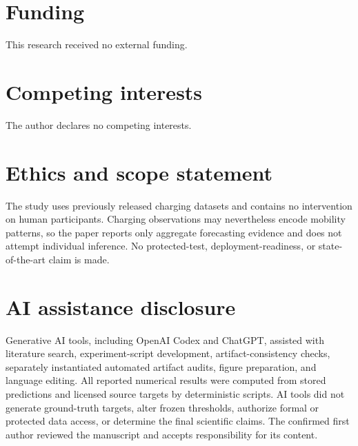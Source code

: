 \documentclass[11pt]{article}
\begin{document}
\section*{Funding}
This research received no external funding.
\section*{Competing interests}
The author declares no competing interests.
\section*{Ethics and scope statement}
The study uses previously released charging datasets and contains no intervention on human participants. Charging observations may nevertheless encode mobility patterns, so the paper reports only aggregate forecasting evidence and does not attempt individual inference. No protected-test, deployment-readiness, or state-of-the-art claim is made.
\section*{AI assistance disclosure}
Generative AI tools, including OpenAI Codex and ChatGPT, assisted with literature search, experiment-script development, artifact-consistency checks, separately instantiated automated artifact audits, figure preparation, and language editing. All reported numerical results were computed from stored predictions and licensed source targets by deterministic scripts. AI tools did not generate ground-truth targets, alter frozen thresholds, authorize formal or protected data access, or determine the final scientific claims. The confirmed first author reviewed the manuscript and accepts responsibility for its content.


\end{document}
